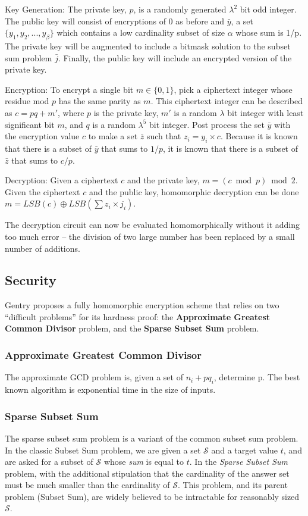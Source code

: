 \documentclass[a4paper,10pt]{article}
\begin{document}
Key Generation: The private key, $p$, is a randomly generated $\lambda^2$ bit
odd integer. The public key will consist of encryptions of $0$ as before and 
$\bar{y}$, a set $\{y_1, y_2, ..., y_{\beta}\}$ which contains a low cardinality
subset of size $\alpha$ whose sum is 1/p. The private key will be augmented to
include a bitmask solution to the subset sum problem $\bar{j}$. Finally, the public key
will include an encrypted version of the private key.

Encryption: To encrypt a single bit $ m \in \{0,1\} $, pick a
ciphertext integer whose residue mod $ p $ has the same parity as
$m$. This ciphertext integer can be described as $ c = pq + m' $,
where $ p $ is the private key, $m'$ is a random $\lambda$ bit integer
with least significant bit $m$, and $q$ is a random $\lambda^5$ bit
integer. Post process the set $\bar{y}$ with the encryption value $c$ to
make a set $\bar{z}$ such that $z_i = y_i \times c$. Because it is known
that there is a subset of $\bar{y}$ that sums to $1/p$, it is known that
there is a subset of $\bar{z}$ that sums to $c/p$.

Decryption: Given a ciphertext $c$ and the private key,
$ m = ( c \bmod p) \bmod 2 $. Given the ciphertext $c$ and the public key,
homomorphic decryption can be done $ m = LSB(c) \oplus LSB(\sum z_i \times j_i) $.

The decryption circuit can now be evaluated homomorphically without it adding
too much error -- the division of two large number has been replaced by a
small number of additions.

\subsection{Security}
Gentry proposes a fully homomorphic encryption scheme that relies on
two ``difficult problems'' for its hardness proof: the
\textbf{Approximate Greatest Common Divisor} problem, and the
\textbf{Sparse Subset Sum} problem.

\subsubsection{Approximate Greatest Common Divisor}
\label{app-gcd}
The approximate GCD problem is, given a set of $ n _{i} + pq_{i} $,
determine p. The best known algorithm is exponential time in the size
of inputs.

\subsubsection{Sparse Subset Sum}
The sparse subset sum problem is a variant of the common subset sum
problem. In the classic Subset Sum problem, we are given a set $
\mathcal{S} $ and a target value $t$, and are asked for a subset of $
\mathcal{S} $ whose \textit{sum} is equal to $t$. In the \textit{Sparse
 Subset Sum} problem, with the additional stipulation that the
cardinality of the answer set must be much smaller than the cardinality
of $ \mathcal{S}$. This problem, and its parent problem (Subset Sum),
are widely believed to be intractable for reasonably sized $ \mathcal{S} $.
\end{document}
